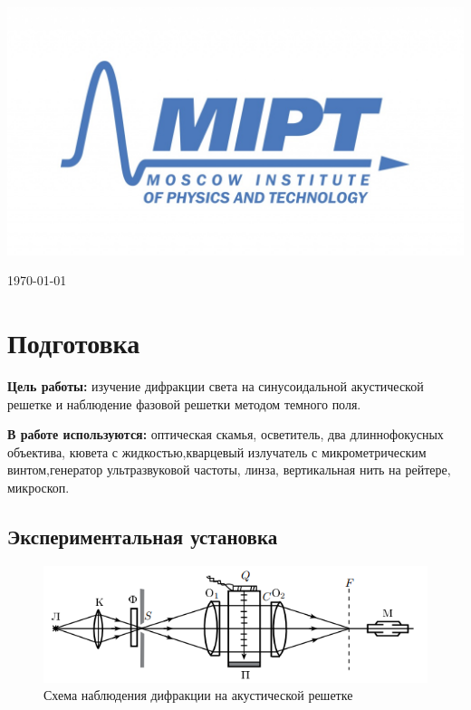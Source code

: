 \documentclass[a4paper, 12pt]{article}
\newenvironment{bottompar}{\par\vspace*{\fill}}{\clearpage}
\begin{document}
\begin{titlepage}
\begin{bottompar}
	\begin{center}
		\includegraphics[width = 80 mm]{logo.jpg}
	\end{center}
	{\large \today}

\end{bottompar}
\vfill %

\end{titlepage}

\section{Подготовка}
\textbf{Цель работы:} изучение дифракции света на синусоидальной акустической решетке и наблюдение фазовой решетки методом темного поля.

\textbf{В работе используются:} оптическая скамья, осветитель, два длиннофокусных объектива, кювета с жидкостью,кварцевый излучатель с микрометрическим винтом,генератор ультразвуковой частоты, линза, вертикальная нить на рейтере, микроскоп.

\subsection*{Экспериментальная установка}

\begin {figure}[H]
	\begin{center}
		\includegraphics[width = 0.6 \textwidth]{sgBB2_croper_ru.png}
		\caption{Схема наблюдения дифракции на акустической решетке}
	\end{center}
\end {figure}
\end{document}

